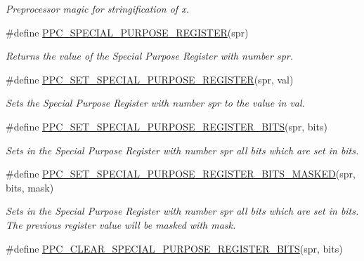 \begin{DoxyCompactItemize}
\begin{DoxyCompactList}\small\item\em Preprocessor magic for stringification of {\itshape x}. \end{DoxyCompactList}\item 
\#define \mbox{\hyperlink{group__RTEMSBSPsPowerPCSharedUtility_gaf2152a905a3a596e7fd4677e5b7fcbcf}{P\+P\+C\+\_\+\+S\+P\+E\+C\+I\+A\+L\+\_\+\+P\+U\+R\+P\+O\+S\+E\+\_\+\+R\+E\+G\+I\+S\+T\+ER}}(spr)
\begin{DoxyCompactList}\small\item\em Returns the value of the Special Purpose Register with number {\itshape spr}. \end{DoxyCompactList}\item 
\#define \mbox{\hyperlink{group__RTEMSBSPsPowerPCSharedUtility_ga13230983701d0de149fb74885ae2a9e8}{P\+P\+C\+\_\+\+S\+E\+T\+\_\+\+S\+P\+E\+C\+I\+A\+L\+\_\+\+P\+U\+R\+P\+O\+S\+E\+\_\+\+R\+E\+G\+I\+S\+T\+ER}}(spr,  val)
\begin{DoxyCompactList}\small\item\em Sets the Special Purpose Register with number {\itshape spr} to the value in {\itshape val}. \end{DoxyCompactList}\item 
\#define \mbox{\hyperlink{group__RTEMSBSPsPowerPCSharedUtility_ga3b8f65ba404c615d00c98d67c03a1240}{P\+P\+C\+\_\+\+S\+E\+T\+\_\+\+S\+P\+E\+C\+I\+A\+L\+\_\+\+P\+U\+R\+P\+O\+S\+E\+\_\+\+R\+E\+G\+I\+S\+T\+E\+R\+\_\+\+B\+I\+TS}}(spr,  bits)
\begin{DoxyCompactList}\small\item\em Sets in the Special Purpose Register with number {\itshape spr} all bits which are set in {\itshape bits}. \end{DoxyCompactList}\item 
\#define \mbox{\hyperlink{group__RTEMSBSPsPowerPCSharedUtility_gaabbe2ec03b9f2d8480196fbb227ce74d}{P\+P\+C\+\_\+\+S\+E\+T\+\_\+\+S\+P\+E\+C\+I\+A\+L\+\_\+\+P\+U\+R\+P\+O\+S\+E\+\_\+\+R\+E\+G\+I\+S\+T\+E\+R\+\_\+\+B\+I\+T\+S\+\_\+\+M\+A\+S\+K\+ED}}(spr,  bits,  mask)
\begin{DoxyCompactList}\small\item\em Sets in the Special Purpose Register with number {\itshape spr} all bits which are set in {\itshape bits}. The previous register value will be masked with {\itshape mask}. \end{DoxyCompactList}\item 
\#define \mbox{\hyperlink{group__RTEMSBSPsPowerPCSharedUtility_ga57428a23dfb8f42b7c7a4ff28cdfae4f}{P\+P\+C\+\_\+\+C\+L\+E\+A\+R\+\_\+\+S\+P\+E\+C\+I\+A\+L\+\_\+\+P\+U\+R\+P\+O\+S\+E\+\_\+\+R\+E\+G\+I\+S\+T\+E\+R\+\_\+\+B\+I\+TS}}(spr,  bits)

\end{DoxyCompactItemize}
